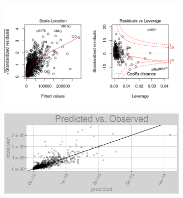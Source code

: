 \begin{figure}[h]
\centering
\begin{subfigure}{1\textwidth}
\centering
\includegraphics[width=.99\textwidth, height=0.475\textheight]{Images/electricity_pls_res_2.png}
\end{subfigure}
\begin{subfigure}{1\textwidth}
\centering
\includegraphics[width=.99\textwidth, height=0.3\textheight]{Images/electricity_pls_pvo.png}
\end{subfigure}
\end{figure}
\FloatBarrier
\newpage
